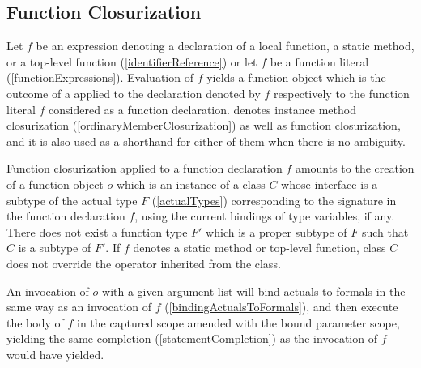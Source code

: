 \documentclass[makeidx]{article}
\begin{document}
{\subsection{Function Closurization}

\LMHash{}%
Let $f$ be an expression denoting
a declaration of a local function, a static method, or a top-level function
(\ref{identifierReference})
or let $f$ be a function literal
(\ref{functionExpressions}).
Evaluation of $f$ yields a function object
which is the outcome of a 
applied to the declaration denoted by $f$
respectively to the function literal $f$ considered as a function declaration.
denotes instance method closurization
(\ref{ordinaryMemberClosurization})
as well as function closurization,
and it is also used as a shorthand for either of them when there is no ambiguity.

\LMHash{}%
Function closurization applied to a function declaration $f$
amounts to the creation of a function object $o$
which is an instance of a class $C$ whose interface is
a subtype of the actual type $F$
(\ref{actualTypes})
corresponding to the signature in the function declaration $f$,
using the current bindings of type variables, if any.
There does not exist a function type $F'$ which is a proper subtype of $F$
such that $C$ is a subtype of $F'$.
If $f$ denotes a static method or top-level function,
class $C$ does not override the \lit{==} operator
inherited from the  class.


\LMHash{}%
An invocation of $o$ with a given argument list will bind actuals to formals
in the same way as an invocation of $f$
(\ref{bindingActualsToFormals}),
and then execute the body of $f$
in the captured scope amended with the bound parameter scope,
yielding the same completion
(\ref{statementCompletion})
as the invocation of $f$ would have yielded.


}
\end{document}
